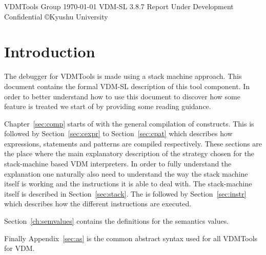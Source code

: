 \documentclass[a4paper,dvips]{article}
\begin{document}



{ VDMTools Group}
{\today}
{VDM-SL 3.8.7}
{Report}
{Under Development}
{Confidential}
{}
{\copyright Kyushu University}
{\item[\mbox{}] \mbox{}}
{}


\addtocounter{tocdepth}{1}
\tableofcontents
\newpage
{}

\parskip12pt
\parindent0pt


\chapter{Introduction}

The debugger for VDMTools is made using a stack machine approach. This
document contains the formal VDM-SL description of this tool
component. In order to better understand how to use this document to
discover how some feature is treated we start of by providing some
reading guidance.

Chapter~\ref{sec:comp} starts of with the general compilation of
constructs. This is followed by Section~\ref{sec:cexpr} to
Section~\ref{sec:cpat} which describes how expressions, statements and
patterns are compiled respectively. These sections are the place where
the main explanatory description of the strategy chosen for the
stack-machine based VDM interpreters. In order to fully understand the
explanation one naturally also need to understand the way the stack
machine itself is working and the instructions it is able to deal
with. The stack-machine itself is described in
Section~\ref{sec:stack}. The is followed by Section~\ref{sec:instr}
which describes how the different instructions are executed.

Section~\ref{ch:semvalues} contains the definitions for the semantics
values.

Finally Appendix~\ref{sec:as} is the common abstract syntax used for
all VDMTools for VDM.

























\appendix





\restoreLambda

\useLambda
\printindex
{}
\end{document}
